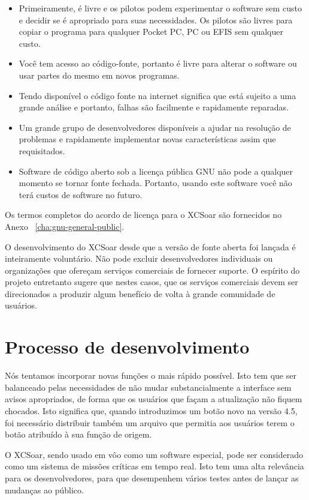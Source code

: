 \begin{itemize}
\item Primeiramente, é livre e os pilotos podem experimentar o software sem custo e decidir se é apropriado para suas necessidades.  Os pilotos são livres para copiar o programa para qualquer Pocket PC, PC ou EFIS sem qualquer custo.
\item Você tem acesso ao código-fonte, portanto é livre para alterar o software ou usar partes do mesmo em novos programas.
\item Tendo disponível o código fonte na internet significa que está sujeito a uma grande análise e portanto, falhas são facilmente e rapidamente reparadas.
\item Um grande grupo de desenvolvedores disponíveis a ajudar na resolução de problemas e rapidamente implementar novas características assim que requisitados.
\item Software de código aberto sob a licença pública GNU não pode a qualquer momento se tornar fonte fechada.  Portanto, usando este software você não terá custos de software no futuro.
\end{itemize}

Os termos completos do acordo de licença para o XCSoar são fornecidos no Anexo ~\ref{cha:gnu-general-public}.

O desenvolvimento do XCSoar desde que a versão de fonte aberta foi lançada é inteiramente voluntário.  Não pode excluir desenvolvedores individuais ou organizações que ofereçam serviços comerciais de fornecer suporte.  O espírito do projeto entretanto sugere que nestes casos, que os serviços comerciais devem ser direcionados a produzir algum benefício de volta à grande comunidade de usuários.


\section{Processo de desenvolvimento}

Nós tentamos incorporar novas funções o mais rápido possível.  Isto tem que ser balanceado pelas necessidades de não mudar substancialmente a interface sem avisos apropriados, de forma que os usuários que façam a atualização não fiquem chocados.  Isto significa que, quando introduzimos um botão novo na versão 4.5, foi necessário distribuir também um arquivo que permitia aos usuários terem o botão atribuído à sua função de origem.

O XCSoar, sendo usado em vôo como um software especial, pode ser considerado como um sistema de missões críticas em tempo real.  Isto tem uma alta relevância para os desenvolvedores, para que desempenhem vários testes antes de lançar as mudanças ao público.

